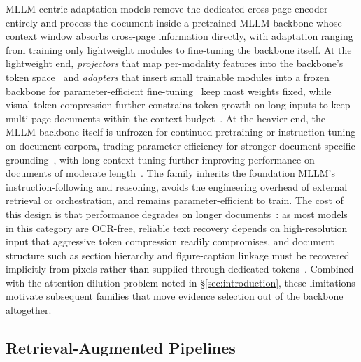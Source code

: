 \documentclass[11pt]{article}
\begin{document}
MLLM-centric adaptation models remove the dedicated cross-page encoder entirely and process the document inside a pretrained MLLM backbone whose context window absorbs cross-page information directly, with adaptation ranging from training only lightweight modules to fine-tuning the backbone itself. At the lightweight end, \emph{projectors} that map per-modality features into the backbone's token space~\cite{tanaka2024instructdoc} and \emph{adapters} that insert small trainable modules into a frozen backbone for parameter-efficient fine-tuning~\cite{zhu2025laytokenllm} keep most weights fixed, while visual-token compression further constrains token growth on long inputs to keep multi-page documents within the context budget~\cite{hu2025mplugdocowl2}. At the heavier end, the MLLM backbone itself is unfrozen for continued pretraining or instruction tuning on document corpora, trading parameter efficiency for stronger document-specific grounding~\cite{duan2025docopilot}, with long-context tuning further improving performance on documents of moderate length~\cite{hu2024mplugdocowl,yu2024texthawk2}. The family inherits the foundation MLLM's instruction-following and reasoning, avoids the engineering overhead of external retrieval or orchestration, and remains parameter-efficient to train. The cost of this design is that performance degrades on longer documents~\cite{jia2024leopard}: as most models in this category are OCR-free, reliable text recovery depends on high-resolution input that aggressive token compression readily compromises, and document structure such as section hierarchy and figure-caption linkage must be recovered implicitly from pixels rather than supplied through dedicated tokens~\cite{hannan2025docslm,duan2025docopilot}. Combined with the attention-dilution problem noted in \S\ref{sec:introduction}, these limitations motivate subsequent families that move evidence selection out of the backbone altogether.

\subsection{Retrieval-Augmented Pipelines} 
\label{sec:arch-ra}
\end{document}
